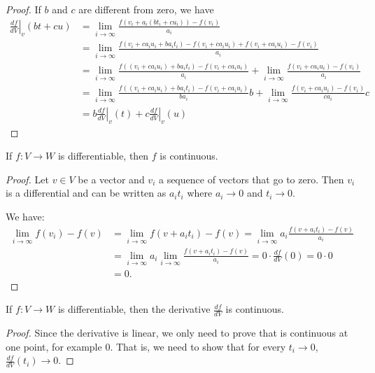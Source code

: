 \documentclass[11pt,letterpaper,fleqn]{memoir}
\begin{document}
\begin{proof}
	If $b$ and $c$ are different from zero, we have
	\begin{align*}		
	\left.\frac{df}{dV} \right|_{v} (b t + c u) &= \lim\limits_{i \to \infty} \frac{f(v_i + a_i (b t_i + c u_i)) - f(v_i)}{a_i} \\
	&= \lim\limits_{i \to \infty} \frac{f(v_i + c a_i u_i + b a_i t_i) - f(v_i + c a_i u_i) + f(v_i + c a_i u_i) - f(v_i)}{a_i} \\
	&= \lim\limits_{i \to \infty} \frac{f((v_i + c a_i u_i) + b a_i t_i) - f(v_i + c a_i u_i)}{a_i}
	+ \lim\limits_{i \to \infty} \frac{ f(v_i + c a_i u_i) - f(v_i)}{a_i} \\
	&= \lim\limits_{i \to \infty} \frac{f((v_i + c a_i u_i) + b a_i t_i) - f(v_i + c a_i u_i)}{b a_i} b
	+ \lim\limits_{i \to \infty} \frac{ f(v_i + c a_i u_i) - f(v_i)}{c a_i} c \\
	&= b \left.\frac{df}{dV} \right|_{v} (t) + c \left.\frac{df}{dV} \right|_{v} (u)
	\end{align*}
	
\end{proof}

\begin{coro}
	If $f : V \to W$ is differentiable, then $f$ is continuous. 
\end{coro}

\begin{proof}
	Let $v \in V$ be a vector and $v_i$ a sequence of vectors that go to zero. Then $v_i$ is a differential and can be written as $a_i t_i$ where $a_i \to 0$ and $t_i \to 0$.
	
	We have:
	\begin{equation}
		\begin{aligned}
		\lim_{ i \to \infty } f(v_i) - f(v) &= \lim_{ i \to \infty } f(v + a_{i}t_{i}) - f(v) = \lim_{ i \to \infty } a_{i} \frac{f(v + a_{i}t_{i}) - f(v)}{a_{i}} \\
		&= \lim_{ i \to \infty } a_{i} \lim_{ i \to \infty } \frac{f(v + a_{i}t_{i}) - f(v)}{a_{i}} = 0 \cdot \frac{df}{dV}(0) = 0 \cdot 0 \\
		&= 0.
		\end{aligned}
	\end{equation}
\end{proof}

\begin{conj}
	If $f : V \to W$ is differentiable, then the derivative $\frac{df}{dV}$ is continuous. 
\end{conj}

\begin{proof}
	Since the derivative is linear, we only need to prove that is continuous at one point, for example $0$. That is, we need to show that for every $t_i \to 0$, $\frac{df}{dV}(t_i) \to 0$.
\end{proof}
\end{document}
